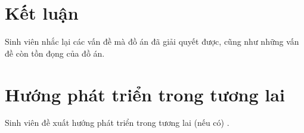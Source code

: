 \documentclass[../DoAn.tex]{subfiles}
\begin{document}
\section{Kết luận}

Sinh viên nhắc lại các vấn đề mà đồ án đã giải quyết được, cũng như những vấn đề còn tồn đọng của đồ án.  

\section{Hướng phát triển trong tương lai}

Sinh viên đề xuất hướng phát triển trong tương lai (nếu có) .  
\end{document}
